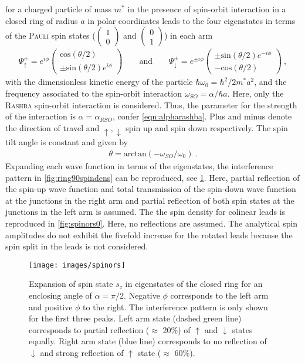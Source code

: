 for a charged particle of mass $m^*$ in the presence of spin-orbit interaction in a closed ring of radius $a$ in polar coordinates \cite{PhysRevB.73.155325} 
leads to the four eigenstates in terms of the \textsc{Pauli} spin states ($\begin{pmatrix}1\\0\end{pmatrix}$ and $\begin{pmatrix}0\\1\end{pmatrix}$) in each arm \cite{nitta1999.695}
\begin{align}
  \Psi^{\pm}_{\uparrow} = e^{i\phi}\begin{pmatrix}\text{cos}(\theta/2)\\\pm\text{sin}(\theta/2)e^{i\phi}\end{pmatrix} 
  \qquad\text{and}\qquad
  \Psi^{\pm}_{\downarrow} = e^{\pm i\phi}\begin{pmatrix}\pm\text{sin}(\theta/2)e^{-i\phi}\\-\text{cos}(\theta/2)\end{pmatrix}\ ,
\end{align}
with the dimensionless kinetic energy of the particle $\hbar\omega_0=\hbar^2/2m^*a^2$, and the frequency associated to the spin-orbit interaction $\omega_{SO} = \alpha/\hbar a$. Here, only the \textsc{Rashba} spin-orbit interaction is considered. Thus, the parameter for the strength of the interaction is $\alpha = \alpha_{RSO}$, confer \cref{eqn:alpharashba}. Plus and minus denote the direction of travel and $\uparrow,\downarrow$ spin up and spin down respectively. The spin tilt angle is constant and given by \cite{PhysRevB.71.033309}
\begin{align}
\theta = \text{arctan}(-\omega_{SO}/\omega_0)\ .
\end{align}
Expanding each wave function in terms of the eigenstates, the interference pattern in \cref{fig:ring90spindens} can be reproduced, see \cref{fig:spinors}. Here, partial reflection of the spin-up wave function and total transmission of the spin-down wave function at the junctions in the right arm and partial reflection of both spin states at the junctions in the left arm is assumed. The the spin density for colinear leads is reproduced in \cref{fig:spinors0}. Here, no reflections are assumed. The analytical spin amplitudes do not exhibit the fivefold increase for the rotated leads because the spin split in the leads is not considered.\par
\begin{figure}[!h]
  \centering
  \texttt{[image: images/spinors]}
  \caption{Expansion of spin state $s_z$ in eigenstates of the closed ring for an enclosing angle of $\alpha = \pi/2$. Negative $\phi$ corresponds to the left arm and positive $\phi$ to the right. The interference pattern is only shown for the first three peaks. Left arm state (dashed green line) corresponds to partial reflection ($\approx$ 20\%) of $\uparrow$ and $\downarrow$ states equally. Right arm state (blue line) corresponds to no reflection of $\downarrow$ and strong reflection of $\uparrow$ state ($\approx$ 60\%).}\label{fig:spinors}
\end{figure}
